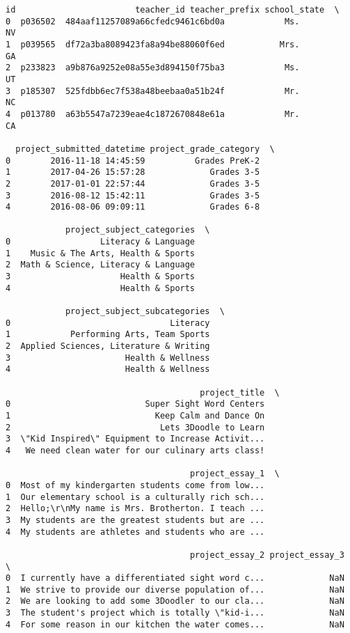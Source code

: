 \documentclass[10pt,parskip=half,
	toc=sectionentrywithdots,
	bibliography=totocnumbered,
	captions=tableheading,numbers=noendperiod]{scrartcl}
\begin{document}
\begin{lstlisting}[language={},postbreak={},numbers=none,xrightmargin=7pt,breakindent=0pt,aboveskip=5pt,belowskip=5pt]
        id                        teacher_id teacher_prefix school_state  \
0  p036502  484aaf11257089a66cfedc9461c6bd0a            Ms.           NV   
1  p039565  df72a3ba8089423fa8a94be88060f6ed           Mrs.           GA   
2  p233823  a9b876a9252e08a55e3d894150f75ba3            Ms.           UT   
3  p185307  525fdbb6ec7f538a48beebaa0a51b24f            Mr.           NC   
4  p013780  a63b5547a7239eae4c1872670848e61a            Mr.           CA   

  project_submitted_datetime project_grade_category  \
0        2016-11-18 14:45:59          Grades PreK-2   
1        2017-04-26 15:57:28             Grades 3-5   
2        2017-01-01 22:57:44             Grades 3-5   
3        2016-08-12 15:42:11             Grades 3-5   
4        2016-08-06 09:09:11             Grades 6-8   

            project_subject_categories  \
0                  Literacy & Language   
1    Music & The Arts, Health & Sports   
2  Math & Science, Literacy & Language   
3                      Health & Sports   
4                      Health & Sports   

            project_subject_subcategories  \
0                                Literacy   
1            Performing Arts, Team Sports   
2  Applied Sciences, Literature & Writing   
3                       Health & Wellness   
4                       Health & Wellness   

                                       project_title  \
0                           Super Sight Word Centers   
1                             Keep Calm and Dance On   
2                              Lets 3Doodle to Learn   
3  \"Kid Inspired\" Equipment to Increase Activit...   
4   We need clean water for our culinary arts class!   

                                     project_essay_1  \
0  Most of my kindergarten students come from low...   
1  Our elementary school is a culturally rich sch...   
2  Hello;\r\nMy name is Mrs. Brotherton. I teach ...   
3  My students are the greatest students but are ...   
4  My students are athletes and students who are ...   

                                     project_essay_2 project_essay_3  \
0  I currently have a differentiated sight word c...             NaN   
1  We strive to provide our diverse population of...             NaN   
2  We are looking to add some 3Doodler to our cla...             NaN   
3  The student's project which is totally \"kid-i...             NaN   
4  For some reason in our kitchen the water comes...             NaN   


\end{lstlisting}
\end{document}
